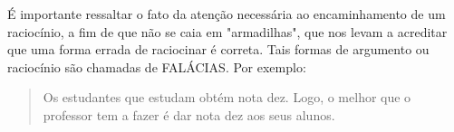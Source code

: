 É importante ressaltar o fato da atenção necessária ao encaminhamento de um raciocínio, a fim de que não se caia em "armadilhas", que nos levam a acreditar que uma forma errada de raciocinar é correta.
Tais formas de argumento ou raciocínio são chamadas de FALÁCIAS.
Por exemplo:

\begin{quote}
    Os estudantes que estudam obtém nota dez. Logo, o melhor que o professor tem a fazer é dar nota dez aos seus alunos.
\end{quote}
